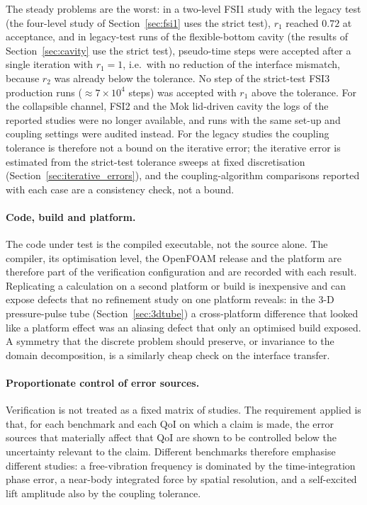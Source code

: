The steady problems are the worst: in a two-level FSI1 study with the legacy test (the four-level study of Section~\ref{sec:fsi1} uses the strict test), $r_1$ reached $0.72$ at acceptance, and in legacy-test runs of the flexible-bottom cavity (the results of Section~\ref{sec:cavity} use the strict test), pseudo-time steps were accepted after a single iteration with $r_1=1$, i.e.\ with no reduction of the interface mismatch, because $r_2$ was already below the tolerance.
No step of the strict-test FSI3 production runs ($\approx7\times10^{4}$ steps) was accepted with $r_1$ above the tolerance.
For the collapsible channel, FSI2 and the Mok lid-driven cavity the logs of the reported studies were no longer available, and runs with the same set-up and coupling settings were audited instead.
For the legacy studies the coupling tolerance is therefore not a bound on the iterative error; the iterative error is estimated from the strict-test tolerance sweeps at fixed discretisation (Section~\ref{sec:iterative_errors}), and the coupling-algorithm comparisons reported with each case are a consistency check, not a bound.

\paragraph{Code, build and platform.}
The code under test is the compiled executable, not the source alone.
The compiler, its optimisation level, the OpenFOAM release and the platform are therefore part of the verification configuration and are recorded with each result.
Replicating a calculation on a second platform or build is inexpensive and can expose defects that no refinement study on one platform reveals: in the 3-D pressure-pulse tube (Section~\ref{sec:3dtube}) a cross-platform difference that looked like a platform effect was an aliasing defect that only an optimised build exposed.
A symmetry that the discrete problem should preserve, or invariance to the domain decomposition, is a similarly cheap check on the interface transfer.

\paragraph{Proportionate control of error sources.}
Verification is not treated as a fixed matrix of studies.
The requirement applied is that, for each benchmark and each QoI on which a claim is made, the error sources that materially affect that QoI are shown to be controlled below the uncertainty relevant to the claim.
Different benchmarks therefore emphasise different studies: a free-vibration frequency is dominated by the time-integration phase error, a near-body integrated force by spatial resolution, and a self-excited lift amplitude also by the coupling tolerance.

